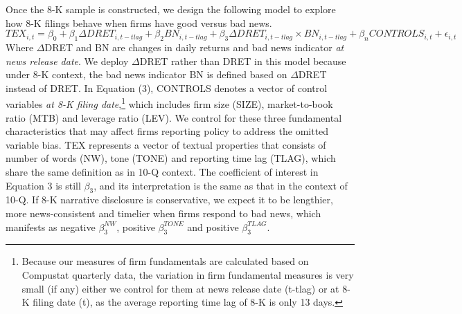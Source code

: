 \documentclass[a4paper]{article}
\begin{document}
\begin{spacing}{2}
Once the 8-K sample is constructed, we design the following model to explore how 8-K filings behave when firms have good versus bad news.
\begin{equation} \label{eq3}
TEX_{i,t}=\beta_0+\beta_1\Delta DRET_{i,t-tlag}+\beta_2BN_{i,t-tlag}+\beta_3\Delta DRET_{i,t-tlag}\times BN_{i,t-tlag}+\beta_nCONTROLS_{i,t}+\epsilon_{i,t}
\end{equation}
Where $\Delta$DRET and BN are changes in daily returns and bad news indicator \textit{at news release date}. We deploy $\Delta$DRET rather than DRET in this model because under 8-K context, the bad news indicator BN is defined based on $\Delta$DRET instead of DRET. In Equation (3), CONTROLS denotes a vector of control variables \textit{at 8-K filing date},\footnote{Because our measures of firm fundamentals are calculated based on Compustat quarterly data, the variation in firm fundamental measures is very small (if any) either we control for them at news release date (t-tlag) or at 8-K filing date (t), as the average reporting time lag of 8-K is only 13 days.} which includes firm size (SIZE), market-to-book ratio (MTB) and leverage ratio (LEV). We control for these three fundamental characteristics that may affect firms reporting policy to address the omitted variable bias. TEX represents a vector of textual properties that consists of number of words (NW), tone (TONE) and reporting time lag (TLAG), which share the same definition as in 10-Q context. The coefficient of interest in Equation 3 is still $\beta_3$, and its interpretation is the same as that in the context of 10-Q. If 8-K narrative disclosure is conservative, we expect it to be lengthier, more news-consistent and timelier when firms respond to bad news, which manifests as negative $\beta_3^{NW}$, positive  $\beta_3^{TONE}$ and positive $\beta_3^{TLAG}$.


\end{spacing}
\end{document}
